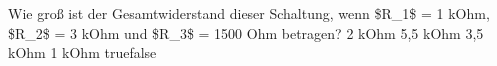     {Wie groß ist der Gesamtwiderstand dieser Schaltung, wenn \$R\_1\$ = 1 kOhm, \$R\_2\$ = 3 kOhm und \$R\_3\$ = 1500 Ohm betragen?}
    {2 kOhm}
    {5,5 kOhm}
    {3,5 kOhm}
    {1 kOhm}
    {true}{false}